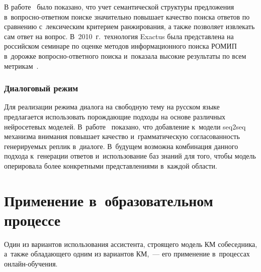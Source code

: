\begin{multicols}{2}
  В работе~\cite{8-sm} было показано, что учет семантической структуры 
предложения в~воп\-рос\-но-от\-вет\-ном поиске значительно повышает 
качество поиска ответов по сравнению с~лексическим критерием 
ранжирования, а также позволяет извлекать сам ответ на вопрос. В~2010~г.\ 
технология Exactus была представлена на российском семинаре по оценке 
методов информационного поиска РОМИП в~дорожке во\-прос\-но-от\-вет\-но\-го 
поиска и~показала высокие результаты по всем метрикам~\cite{12-sm}.
  
  \subsubsection{Диалоговый режим}%
  
  Для реализации режима диалога на свободную тему на русском языке 
предлагается использовать порождающие подходы на основе различных 
нейросетевых моделей. В~работе~\cite{13-sm} показано, что добавление 
к~модели seq2seq механизма внимания повышает качество и~грамматическую 
согласованность генерируемых реплик в~диалоге. В~будущем возможна 
комбинация данного подхода к~генерации ответов и~использование баз знаний 
для того, чтобы модель оперировала более конкретными представлениями 
в~каждой области.

\section{Применение в~образовательном процессе}

  Один из вариантов использования ассистента, строящего модель 
КМ собеседника, а~также обладающего одним из вариантов КМ,~--- 
  его применение в~процессах он\-лайн-обуче\-ния. 
  

\end{multicols}

